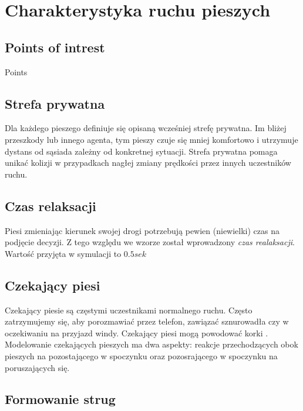 \chapter{Charakterystyka ruchu pieszych}

\section{Points of intrest}
\label{sec:pointsOfInterest}
 Points
 
\section{Strefa prywatna}
\label{sec:strefaPryw}

Dla każdego pieszego definiuje się opisaną wcześniej strefę prywatna.
Im bliżej przeszkody lub innego agenta, tym pieszy czuje się mniej komfortowo i utrzymuje dystans od sąsiada zależny od konkretnej sytuacji. Strefa prywatna pomaga unikać kolizji w przypadkach nagłej zmiany prędkości przez innych uczestników ruchu.

\section{Czas relaksacji}
\label{sec:czasRelaksacji}

Piesi zmieniając kierunek swojej drogi potrzebują pewien (niewielki) czas na podjęcie decyzji. Z tego względu we wzorze został wprowadzony \textit{czas realaksacji}. Wartość przyjęta w symulacji to $0.5 sek$

\section{Czekający piesi}
\label{sec:czekajacyPiesi}

Czekający piesie są częstymi uczestnikami normalnego ruchu. Często zatrzymujemy się, aby porozmawiać przez telefon, zawiązać sznurowadła czy w oczekiwaniu na przyjazd windy. Czekający piesi mogą powodować korki \cite{6}. Modelowanie czekających pieszych ma dwa aspekty: reakcje  przechodzących obok pieszych na pozostającego w spoczynku oraz pozosrającego w spoczynku na poruszających się.

\section{Formowanie strug}
\label{sec:strugi}

